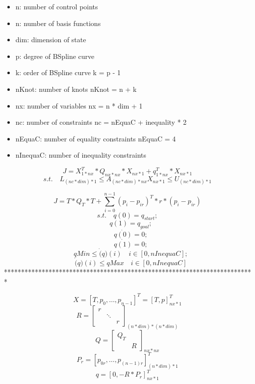 \documentclass[]{article}
\begin{document}
  
\begin{itemize}
    \item[] n: number of control points 
    \item[] n: number of basis functions
    \item[] dim: dimension of state 
    \item[] p: degree of BSpline curve 
    \item[] k: order of BSpline curve k = p - 1
    \item[] nKnot: number of knots nKnot = n + k
    \item[] nx: number of variables nx = n * dim + 1
    \item[] nc: number of constraints nc = nEquaC + inequality * 2
    \item[] nEquaC: number of equality constraints nEquaC = 4
    \item[] nInequaC: number of inequality constraints
\end{itemize}


    \[ J = X^{T}_{1 * nx} * Q_{nx * nx} * X_{nx * 1} + q^{T}_{1 * nx} * X_{nx * 1} \]
    \[ s.t.\quad L_{(nc * dim) * 1} \leq A_{(nc * dim) * nx}X_{nx * 1} \leq U_{(nc * dim) * 1} \]

    \[ J = T * Q_{T} * T + \sum_{i = 0}^{n - 1}(p_{i} - p_{ir})^{T} * r * (p_{i} - p_{ir}) \]
    \[ s.t.\quad q(0) = q_{start}; \]
    \[ \quad q(1) = q_{goal}; \]
    \[ \quad \dot{q(0)} = 0; \]
    \[ \quad \dot{q(1)} = 0; \]
    \[ \quad qMin \leq \dot(q)(i) \quad i \in [0, nInequaC]; \] 
    \[ \quad \dot(q)(i) \leq qMax \quad i \in [0, nInequaC] \]   
    *************************************************************************

    \[X = [T, p_{0}, \ldots, p_{n - 1}]^{T} = [T, p]^{T}_{nx * 1} \]
    \[ R = \begin{bmatrix}
             r    &    & \\
             & \ddots  & \\
             &    &    r
    \end{bmatrix}_{(n * dim) * (n * dim)} \]
    \[ Q = \begin{bmatrix}
        Q_{T} & \\
         &    R   
    \end{bmatrix}_{nx * nx} \]
    \[ P_{r} = [p_{0r},\ldots,p_{(n - 1)r}]^{T}_{(n * dim) * 1} \]
    \[ q = [0, -R * P_{r}]^{T}_{nx * 1} \]
\end{document}
